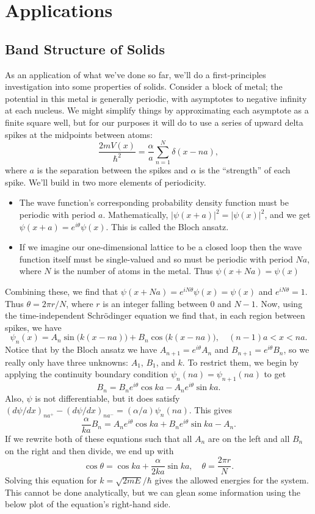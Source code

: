 \documentclass[../p052main.tex]{subfiles}
\begin{document}
\chapter{Applications}
\section{Band Structure of Solids}
As an application of what we've done so far, we'll do a first-principles investigation into some properties of solids.
Consider a block of metal; the potential in this metal is generally periodic, with asymptotes to negative infinity at each nucleus.
We might simplify things by approximating each asymptote as a finite square well, but for our purposes it will do to use a series of upward delta spikes at the midpoints between atoms:
\[ \frac{2mV(x)}{\hbar^2} = \frac{\alpha}{a} \sum_{n=1}^{N} \delta(x - na), \]
where $a$ is the separation between the spikes and $\alpha$ is the ``strength'' of each spike.
We'll build in two more elements of periodicity.
\begin{itemize}
    \item The wave function's corresponding probability density function must be periodic with period $a$.
    Mathematically, $| \psi(x + a)|^2 = |\psi(x)|^2$, and we get $\psi(x+a) = e^{i\theta} \psi(x)$.
    This is called the Bloch ansatz.

    \item If we imagine our one-dimensional lattice to be a closed loop then the wave function itself must be single-valued and so must be periodic with period $Na$, where $N$ is the number of atoms in the metal.
    Thus $\psi(x + Na) = \psi(x)$
\end{itemize}
Combining these, we find that $\psi(x + Na) = e^{iN\theta} \psi(x) = \psi(x)$ and $e^{iN\theta} = 1$.
Thus $\theta = 2 \pi r / N$, where $r$ is an integer falling between $0$ and $N-1$.
Now, using the time-independent Schrödinger equation we find that, in each region between spikes, we have
\[ \psi_n(x) = A_n \sin \big( k(x - na) \big) + B_n \cos \big( k(x - na) \big), \quad (n-1)a < x < na. \]
Notice that by the Bloch ansatz we have $A_{n+1} = e^{i\theta} A_n$ and $B_{n+1} = e^{i\theta} B_n$, so we really only have three unknowns: $A_1$, $B_1$, and $k$.
To restrict them, we begin by applying the continuity boundary condition $\psi_n(na) = \psi_{n+1}(na)$ to get
\[ B_n = B_n e^{i\theta} \cos ka - A_n e^{i\theta} \sin ka. \]
Also, $\psi$ is not differentiable, but it does satisfy $\left( d\psi / dx \right)_{na^+} - \left( d\psi / dx \right)_{na^-} = (\alpha / a) \psi_n(na)$.
This gives
\[ \frac{\alpha}{ka} B_n = A_n e^{i\theta} \cos ka + B_n e^{i\theta} \sin ka - A_n. \]
If we rewrite both of these equations such that all $A_n$ are on the left and all $B_n$ on the right and then divide, we end up with
\[ \cos \theta = \cos ka + \frac{\alpha}{2ka} \sin ka, \quad \theta = \frac{2\pi r}{N}. \]
Solving this equation for $k = \sqrt{2mE} / \hbar$ gives the allowed energies for the system.
This cannot be done analytically, but we can glean some information using the below plot of the equation's right-hand side.
\end{document}
